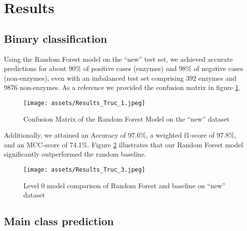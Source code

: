 \documentclass{bioinfo}
\begin{document}
\section{Results}	

\subsection{Binary classification}\label{sec:RF_level0}
Using the Random Forest model on the “new” test set, we achieved accurate predictions for about 
$90\%$ of positive cases (enzymes) and $98\%$ of negative cases (non-enzymes), even with an imbalanced test set comprising 
$392$ enzymes and 9876 non-enzymes. As a reference we provided the confusion matrix in figure \ref{fig:RF_conf_l0}.

\begin{figure}[!hb]
\texttt{[image: assets/Results\_Truc\_1.jpeg]}
\caption{Confusion Matrix of the Random Forest Model on the “new” dataset}\label{fig:RF_conf_l0}
\end{figure}

Additionally, we attained an Accuracy of 97.6\%, a weighted f1-score of 97.8\%, and an MCC-score of 74.1\%. 
Figure \ref{fig:RF_scores_l0} illustrates that our Random Forest model significantly outperformed the random baseline.

%
\begin{figure}[!ht]
\texttt{[image: assets/Results\_Truc\_3.jpeg]}
\caption{Level 0 model comparison of Random Forest and baseline on “new” dataset}\label{fig:RF_scores_l0}
\end{figure}




\subsection{Main class prediction}
\end{document}
